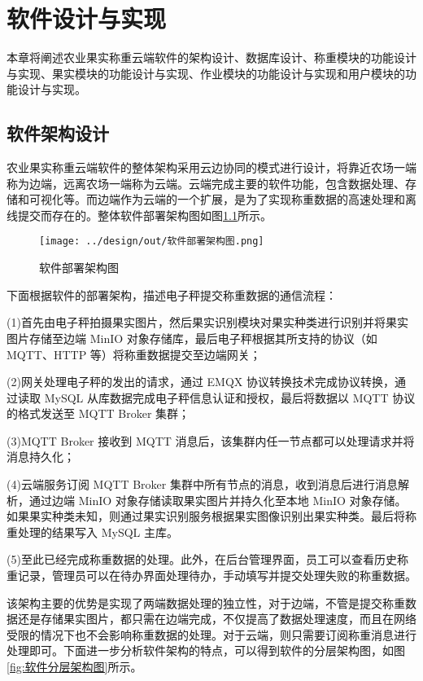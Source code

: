\chapter{软件设计与实现}

本章将阐述农业果实称重云端软件的架构设计、数据库设计、称重模块的功能设计与实现、果实模块的功能设计与实现、作业模块的功能设计与实现和用户模块的功能设计与实现。

\section{软件架构设计}\label{sec:architecture}

农业果实称重云端软件的整体架构采用云边协同的模式进行设计，将靠近农场一端称为边端，远离农场一端称为云端。云端完成主要的软件功能，包含数据处理、存储和可视化等。而边端作为云端的一个扩展，是为了实现称重数据的高速处理和离线提交而存在的。整体软件部署架构图如图\ref{fig:软件部署架构图}所示。

\begin{figure}[H]
    \centering
    \texttt{[image: ../design/out/软件部署架构图.png]}
    \caption{软件部署架构图}
    \label{fig:软件部署架构图}
\end{figure}

下面根据软件的部署架构，描述电子秤提交称重数据的通信流程：

(1)首先由电子秤拍摄果实图片，然后果实识别模块对果实种类进行识别并将果实图片存储至边端 MinIO 对象存储库，最后电子秤根据其所支持的协议（如 MQTT、HTTP 等）将称重数据提交至边端网关；

(2)网关处理电子秤的发出的请求，通过 EMQX 协议转换技术完成协议转换，通过读取 MySQL 从库数据完成电子秤信息认证和授权，最后将数据以 MQTT 协议的格式发送至 MQTT Broker 集群；

(3)MQTT Broker 接收到 MQTT 消息后，该集群内任一节点都可以处理请求并将消息持久化；

(4)云端服务订阅 MQTT Broker 集群中所有节点的消息，收到消息后进行消息解析，通过边端 MinIO 对象存储读取果实图片并持久化至本地 MinIO 对象存储。如果果实种类未知，则通过果实识别服务根据果实图像识别出果实种类。最后将称重处理的结果写入 MySQL 主库。

(5)至此已经完成称重数据的处理。此外，在后台管理界面，员工可以查看历史称重记录，管理员可以在待办界面处理待办，手动填写并提交处理失败的称重数据。

该架构主要的优势是实现了两端数据处理的独立性，对于边端，不管是提交称重数据还是存储果实图片，都只需在边端完成，不仅提高了数据处理速度，而且在网络受限的情况下也不会影响称重数据的处理。对于云端，则只需要订阅称重消息进行处理即可。下面进一步分析软件架构的特点，可以得到软件的分层架构图，如图\ref{fig:软件分层架构图}所示。

